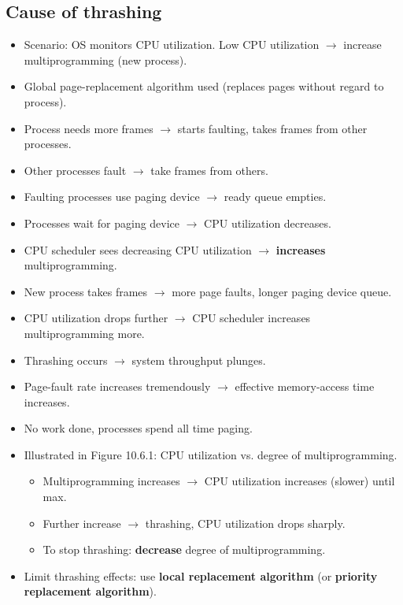 \subsection{Cause of thrashing}
\begin{itemize}
    \item Scenario: OS monitors CPU utilization. Low CPU utilization $\rightarrow$ increase multiprogramming (new process).
    \item Global page-replacement algorithm used (replaces pages without regard to process).
    \item Process needs more frames $\rightarrow$ starts faulting, takes frames from other processes.
    \item Other processes fault $\rightarrow$ take frames from others.
    \item Faulting processes use paging device $\rightarrow$ ready queue empties.
    \item Processes wait for paging device $\rightarrow$ CPU utilization decreases.
    \item CPU scheduler sees decreasing CPU utilization $\rightarrow$ \textbf{increases} multiprogramming.
    \item New process takes frames $\rightarrow$ more page faults, longer paging device queue.
    \item CPU utilization drops further $\rightarrow$ CPU scheduler increases multiprogramming more.
    \item Thrashing occurs $\rightarrow$ system throughput plunges.
    \item Page-fault rate increases tremendously $\rightarrow$ effective memory-access time increases.
    \item No work done, processes spend all time paging.
    \item Illustrated in Figure 10.6.1: CPU utilization vs. degree of multiprogramming.
    \begin{itemize}
        \item Multiprogramming increases $\rightarrow$ CPU utilization increases (slower) until max.
        \item Further increase $\rightarrow$ thrashing, CPU utilization drops sharply.
        \item To stop thrashing: \textbf{decrease} degree of multiprogramming.
    \end{itemize}
    \item Limit thrashing effects: use \textbf{local replacement algorithm} (or \textbf{priority replacement algorithm}).

\end{itemize}
